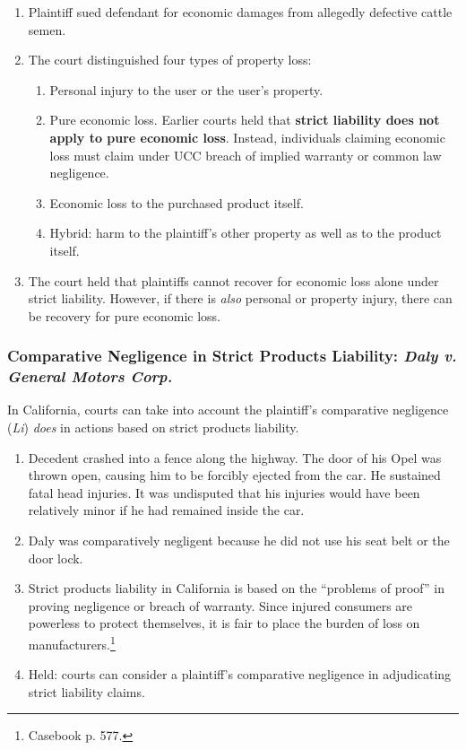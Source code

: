 \begin{enumerate}
    \item Plaintiff sued defendant for economic damages from allegedly 
    defective cattle semen.
    \item The court distinguished four types of property loss:
    \begin{enumerate}
        \item Personal injury to the user or the user's property.
        \item Pure economic loss. Earlier courts held that \textbf{strict liability 
        does not apply to pure economic loss}. Instead, individuals claiming 
        economic loss must claim under UCC breach of implied warranty or common 
        law negligence.
        \item Economic loss to the purchased product itself.
        \item Hybrid: harm to the plaintiff's other property as well as to the 
        product itself.
    \end{enumerate}
    \item The court held that plaintiffs cannot recover for economic loss 
    alone under strict liability. However, if there is \emph{also} personal or 
    property injury, there can be recovery for pure economic loss.
\end{enumerate}
 
\subsubsection{Comparative Negligence in Strict Products Liability: \emph{Daly 
v. General Motors Corp.}}

In California, courts can take into account the plaintiff's comparative 
negligence (\emph{Li}) \emph{does} in actions based on strict products 
liability.

\begin{enumerate}
    \item Decedent crashed into a fence along the highway. The door of his 
    Opel was thrown open, causing him to be forcibly ejected from the car. He 
    sustained fatal head injuries. It was undisputed that his injuries would 
    have been relatively minor if he had remained inside the car.
    \item Daly was comparatively negligent because he did not use his seat 
    belt or the door lock.
    \item Strict products liability in California is based on the ``problems 
    of proof'' in proving negligence or breach of warranty. Since injured 
    consumers are powerless to protect themselves, it is fair to place the 
    burden of loss on manufacturers.\footnote{Casebook p. 577.}
    \item Held: courts can consider a plaintiff's comparative negligence in 
    adjudicating strict liability claims.
\end{enumerate}

